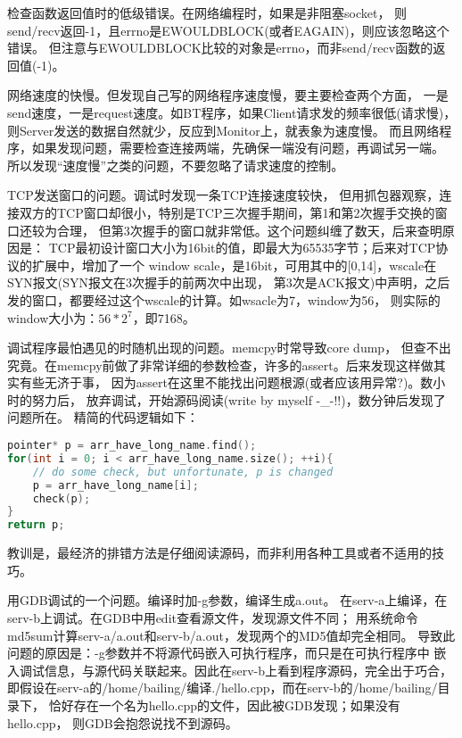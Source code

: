  检查函数返回值时的低级错误。在网络编程时，如果是非阻塞socket，
则send/recv返回-1，且errno是EWOULDBLOCK(或者EAGAIN)，则应该忽略这个错误。
但注意与EWOULDBLOCK比较的对象是errno，而非send/recv函数的返回值(-1)。

 网络速度的快慢。但发现自己写的网络程序速度慢，要主要检查两个方面，
一是send速度，一是request速度。如BT程序，如果Client请求发的频率很低(请求慢)，
则Server发送的数据自然就少，反应到Monitor上，就表象为速度慢。
而且网络程序，如果发现问题，需要检查连接两端，先确保一端没有问题，再调试另一端。
所以发现“速度慢”之类的问题，不要忽略了请求速度的控制。

 TCP发送窗口的问题。调试时发现一条TCP连接速度较快，
但用抓包器观察，连接双方的TCP窗口却很小，特别是TCP三次握手期间，第1和第2次握手交换的窗口还较为合理，
但第3次握手的窗口就非常低。这个问题纠缠了数天，后来查明原因是：
TCP最初设计窗口大小为16bit的值，即最大为65535字节；后来对TCP协议的扩展中，增加了一个
window scale，是16bit，可用其中的[0,14]，wscale在SYN报文(SYN报文在3次握手的前两次中出现，
第3次是ACK报文)中声明，之后发的窗口，都要经过这个wscale的计算。如wsacle为7，window为56，
则实际的window大小为：$56 * 2^{7}$，即7168。

 调试程序最怕遇见的时随机出现的问题。memcpy时常导致core dump，
但查不出究竟。在memcpy前做了非常详细的参数检查，许多的assert。后来发现这样做其实有些无济于事，
因为assert在这里不能找出问题根源(或者应该用异常?)。数小时的努力后，
放弃调试，开始源码阅读(write by myself -\_-!!)，数分钟后发现了问题所在。
精简的代码逻辑如下：
\noindent\begin{lstlisting}[language=C++]
pointer* p = arr_have_long_name.find();
for(int i = 0; i < arr_have_long_name.size(); ++i){
    // do some check, but unfortunate, p is changed
    p = arr_have_long_name[i];
    check(p);
}
return p;
\end{lstlisting}
教训是，最经济的排错方法是仔细阅读源码，而非利用各种工具或者不适用的技巧。

 用GDB调试的一个问题。编译时加-g参数，编译生成a.out。
在serv-a上编译，在serv-b上调试。在GDB中用edit查看源文件，发现源文件不同；
用系统命令md5sum计算serv-a/a.out和serv-b/a.out，发现两个的MD5值却完全相同。
导致此问题的原因是：-g参数并不将源代码嵌入可执行程序，而只是在可执行程序中
嵌入调试信息，与源代码关联起来。因此在serv-b上看到程序源码，完全出于巧合，
即假设在serv-a的/home/bailing/编译./hello.cpp，而在serv-b的/home/bailing/目录下，
恰好存在一个名为hello.cpp的文件，因此被GDB发现；如果没有hello.cpp，
则GDB会抱怨说找不到源码。

